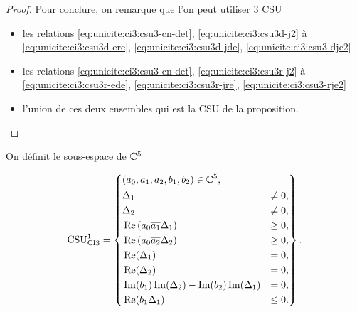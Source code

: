 \begin{proof}
    Pour conclure, on remarque que l'on peut utiliser 3 CSU
    \begin{itemize}
      \item les relations \eqref{eq:unicite:ci3:csu3-cn-det}, \eqref{eq:unicite:ci3:csu3d-j2} à \eqref{eq:unicite:ci3:csu3d-ere}, \eqref{eq:unicite:ci3:csu3d-jde}, \eqref{eq:unicite:ci3:csu3-dje2}
      \item les relations \eqref{eq:unicite:ci3:csu3-cn-det}, \eqref{eq:unicite:ci3:csu3r-j2} à \eqref{eq:unicite:ci3:csu3r-ede}, \eqref{eq:unicite:ci3:csu3r-jre}, \eqref{eq:unicite:ci3:csu3-rje2}
      \item l'union de ces deux ensembles qui est la CSU de la proposition.
    \end{itemize}

    \end{proof}
  \begin{defn}
    \label{def:csu:ci3-1}

    On définit le sous-espace de \(\CC^5\)

    \begin{equation*}
      \CSU[1]{CI3} = \left\lbrace 
      \begin{aligned}
      &(a_0,a_1,a_2,b_1,b_2) \in \CC^5,
      \\
      &\begin{aligned}
        &\Delta_1 & \not= 0,
        \\
        &\Delta_2 & \not= 0,
        \\
        &\Re\left(a_0\conj{a_1}\Delta_1\right) &\ge 0,
        \\
        &\Re\left(a_0\conj{a_2}\Delta_2\right) &\ge 0,
        \\
        &\Re(\Delta_1) &= 0,
        \\
        &\Re(\Delta_2) &= 0,
        \\
        &\Im(b_1)\Im(\Delta_2) - \Im(b_2)\Im(\Delta_1) &= 0,
        \\
        &\Re(b_1\Delta_1) &\le 0.
        \end{aligned}
      \end{aligned}
      \right\rbrace.
    \end{equation*}
  \end{defn}
  

